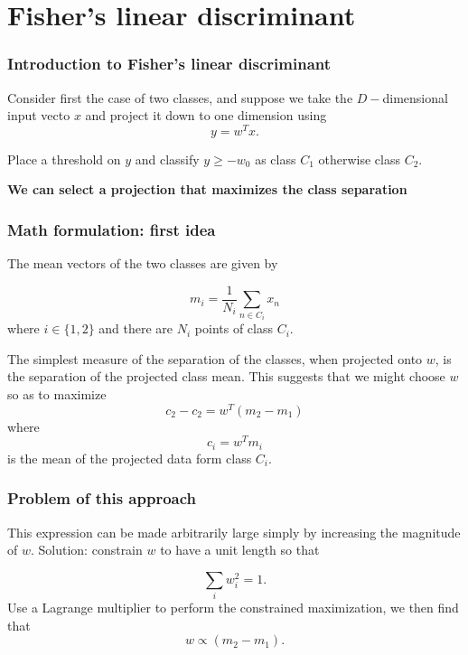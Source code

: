 \section{Fisher's linear discriminant} 

\begin{frame}
    \frametitle{Introduction to Fisher's linear discriminant}

    Consider first the case of 
    two classes, and suppose we take the
    $D-$dimensional input vecto $x$ and project it down to one 
    dimension using 
    \begin{equation}\label{eq:05:projection}
        y = w^T x. 
    \end{equation}

    Place a threshold on $y$ and classify
    $y \geq -w_0$ as class $C_1$ otherwise class $C_2$. 

    \textbf{We can select a projection that maximizes the class separation}
\end{frame}

\begin{frame}
    \frametitle{Math formulation: first idea}
    The mean vectors of the two classes are given by

    \begin{equation}
        m_i = 
        \frac{1}{N_i} 
        \sum_{n \in C_i} x_n
    \end{equation}
    where $i \in \{1,2\}$ and there are $N_i$ points of class $C_i$.
    
    The simplest measure of the separation of the classes,
    when projected onto $w$, is the 
    separation of the projected class mean.
    This suggests that we might choose $w$ so as to maximize 
    \begin{equation}
        c_2 - c_2 = w^T (m_2 - m_1)
    \end{equation}
    where 
    \begin{equation}\label{eq:05:proyected_mean}
        c_i = w^T m_i
    \end{equation}
    is the mean of the projected data form class $C_i$. 
\end{frame}

\begin{frame}
    \frametitle{Problem of this approach}
    This expression can be made arbitrarily large simply by increasing the magnitude of $w$. 
    Solution: constrain $w$ to have a unit length so that 

    \begin{equation}
        \sum_i w^2_i = 1.
    \end{equation}
    Use a Lagrange multiplier to perform the constrained maximization,
    we then find that 
    \begin{equation}
        w \propto (m_2 - m_1).
    \end{equation}
\end{frame}

